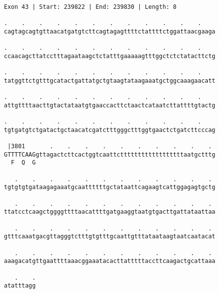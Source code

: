 \documentclass{article}
\begin{document}
\begin{Verbatim}[fontfamily=courier]
Exon 43 | Start: 239822 | End: 239830 | Length: 8

.    .    .    .    .    .    .    .    .    .    .    .    
cagtagcagtgttaacatgatgtcttcagtagagttttctattttctggattaacgaaga

.    .    .    .    .    .    .    .    .    .    .    .    
ccaacagcttatcctttagaataagctctatttgaaaaagtttggctctctatacttctg

.    .    .    .    .    .    .    .    .    .    .    .    
tatggttctgtttgcatactgattatgctgtaagtataagaaatgctggcaaagaacatt

.    .    .    .    .    .    .    .    .    .    .    .    
attgttttaacttgtactataatgtgaaccacttctaactcataatcttattttgtactg

.    .    .    .    .    .    .    .    .    .    .    .    
tgtgatgtctgatactgctaacatcgatctttgggctttggtgaactctgatcttcccag

 |3801       .    .    .    .    .    .    .    .    .    . 
GTTTTCAAGgttagactcttcactggtcaattcttttttttttttttttttaatgctttg
  F  Q  G                                                   

   .    .    .    .    .    .    .    .    .    .    .    . 
tgtgtgtgataagagaaatgcaattttttgctataattcagaagtcattggagagtgctg

   .    .    .    .    .    .    .    .    .    .    .    . 
ttatcctcaagctggggttttaacattttgatgaaggtaatgtgacttgattataattaa

   .    .    .    .    .    .    .    .    .    .    .    . 
gtttcaaatgacgttagggtctttgtgtttgcaattgtttataataagtaatcaatacat

   .    .    .    .    .    .    .    .    .    .    .    . 
aaagacatgttgaattttaaacggaaatacacttatttttaccttcaagactgcattaaa

   .    .
atatttagg
\end{Verbatim}
\newpage
\end{document}
